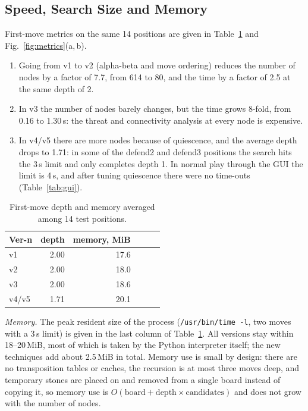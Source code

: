 \documentclass[a4paper,10pt,twocolumn]{article}
\newenvironment{points}{\begin{enumerate}[label=(\arabic*),leftmargin=*,itemsep=2pt,topsep=3pt]}{\end{enumerate}}
\newcommand{\code}[1]{\texttt{#1}}
\begin{document}
\subsection{Speed, Search Size and Memory}\label{sec:speed}
First-move metrics on the same 14 positions are given in Table~\ref{tab:metrics} and Fig.~\ref{fig:metrics}(a,\,b).
\begin{points}
\item Going from v1 to v2 (alpha-beta and move ordering) reduces the number of nodes by a factor of 7.7, from 614 to 80, and the time by a factor of 2.5 at the same depth of 2.
\item In v3 the number of nodes barely changes, but the time grows 8-fold, from 0.16 to 1.30\,s: the threat and connectivity analysis at every node is expensive.
\item In v4/v5 there are more nodes because of quiescence, and the average depth drops to 1.71: in some of the defend2 and defend3 positions the search hits the 3\,s limit and only completes depth 1. In normal play through the GUI the limit is 4\,s, and after tuning quiescence there were no time-outs (Table~\ref{tab:gui}).
\end{points}

\begin{table}[h]
\centering
\small
\setlength{\tabcolsep}{3pt}
\caption{First-move depth and memory averaged among 14 test positions.}
\label{tab:metrics}
\begin{tabular}{@{}lrrrrr@{}}
\toprule
Ver-n & depth & memory, MiB \\
\midrule
v1 & 2.00 & 17.6 \\
v2 & 2.00 & 18.0 \\
v3 & 2.00 & 18.6 \\
v4/v5 & 1.71 & 20.1 \\
\bottomrule
\end{tabular}
\end{table}

\emph{Memory.} The peak resident size of the process (\code{/usr/bin/time -l}, two moves with a 3\,s limit) is given in the last column of Table~\ref{tab:metrics}. All versions stay within 18--20\,MiB, most of which is taken by the Python interpreter itself; the new techniques add about 2.5\,MiB in total. Memory use is small by design: there are no transposition tables or caches, the recursion is at most three moves deep, and temporary stones are placed on and removed from a single board instead of copying it, so memory use is $O(\text{board}+\text{depth}\times\text{candidates})$ and does not grow with the number of nodes.
\end{document}
